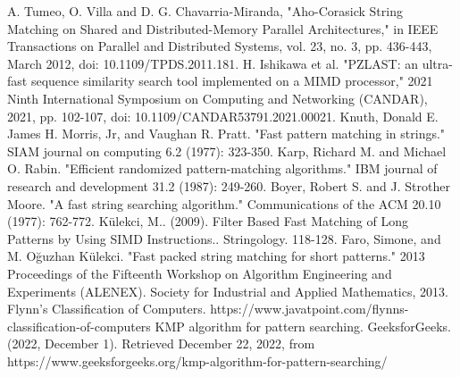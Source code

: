 \documentclass[11pt]{article}       %
\begin{document}
\begin{thebibliography}{99}
A. Tumeo, O. Villa and D. G. Chavarria-Miranda, "Aho-Corasick String Matching on Shared and Distributed-Memory Parallel Architectures," in IEEE Transactions on Parallel and Distributed Systems, vol. 23, no. 3, pp. 436-443, March 2012, doi: 10.1109/TPDS.2011.181.
H. Ishikawa et al. "PZLAST: an ultra-fast sequence similarity search tool implemented on a MIMD processor," 2021 Ninth International Symposium on Computing and Networking (CANDAR), 2021, pp. 102-107, doi: 10.1109/CANDAR53791.2021.00021.
Knuth, Donald E. James H. Morris, Jr, and Vaughan R. Pratt. "Fast pattern matching in strings." SIAM journal on computing 6.2 (1977): 323-350.
Karp, Richard M. and Michael O. Rabin. "Efficient randomized pattern-matching algorithms." IBM journal of research and development 31.2 (1987): 249-260.
Boyer, Robert S. and J. Strother Moore. "A fast string searching algorithm." Communications of the ACM 20.10 (1977): 762-772.
Külekci, M.. (2009). Filter Based Fast Matching of Long Patterns by Using SIMD Instructions.. Stringology. 118-128. 
Faro, Simone, and M. Oğuzhan Külekci. "Fast packed string matching for short patterns." 2013 Proceedings of the Fifteenth Workshop on Algorithm Engineering and Experiments (ALENEX). Society for Industrial and Applied Mathematics, 2013.
Flynn's Classification of Computers. https://www.javatpoint.com/flynns-classification-of-computers
KMP algorithm for pattern searching. GeeksforGeeks. (2022, December 1). Retrieved December 22, 2022, from https://www.geeksforgeeks.org/kmp-algorithm-for-pattern-searching/ 
\end{thebibliography}

\end{document}
